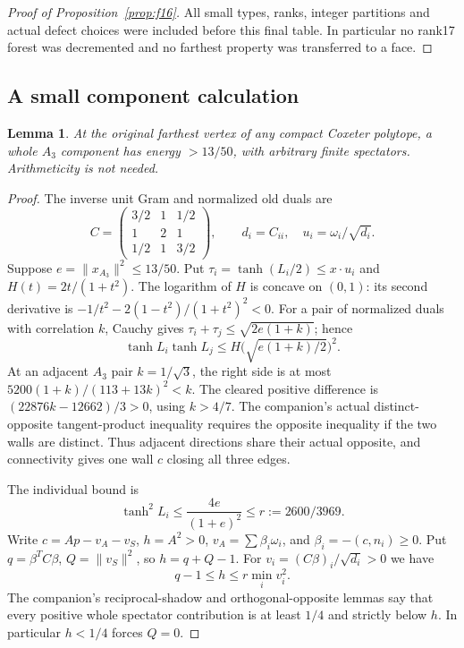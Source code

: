 \documentclass[11pt]{article}
\newtheorem{lemma}[theorem]{Lemma}
\begin{document}
\begin{proof}[Proof of Proposition~\ref{prop:f16}]
All small types, ranks, integer partitions and actual defect choices
were included before this final table. In particular no rank17 forest
was decremented and no farthest property was transferred to a face.
\end{proof}

\subsection{A small component calculation}

\begin{lemma}\label{lem:A3point26}
At the original farthest vertex of any compact Coxeter polytope,
a whole $A_3$ component has energy $>13/50$, with arbitrary finite
spectators. Arithmeticity is not needed.
\end{lemma}
\begin{proof}
The inverse unit Gram and normalized old duals are
\[
 C=\begin{pmatrix}3/2&1&1/2\\1&2&1\\1/2&1&3/2\end{pmatrix},
 \qquad d_i=C_{ii},\quad u_i=\omega_i/\sqrt{d_i}.
\]
Suppose $e=\|x_{A_3}\|^2\le13/50$. Put
$\tau_i=\tanh(L_i/2)\le x\cdot u_i$ and
$H(t)=2t/(1+t^2)$. The logarithm of $H$ is concave on $(0,1)$:
its second derivative is $-1/t^2-2(1-t^2)/(1+t^2)^2<0$.
For a pair of normalized duals with correlation $k$, Cauchy gives
$\tau_i+\tau_j\le\sqrt{2e(1+k)}$; hence
\[
 \tanh L_i\tanh L_j
 \le H\bigl(\sqrt{e(1+k)/2}\bigr)^2.
\]
At an adjacent $A_3$ pair $k=1/\sqrt3$, the right side is at most
$5200(1+k)/(113+13k)^2<k$.
The cleared positive difference is $(22876k-12662)/3>0$,
using $k>4/7$. The companion's actual distinct-opposite
tangent-product inequality requires the opposite inequality if the
two walls are distinct. Thus adjacent directions share their actual
opposite, and connectivity gives one wall $c$ closing all three edges.

The individual bound is
\[
 \tanh^2L_i\le\frac{4e}{(1+e)^2}\le r:=2600/3969.
\]
Write $c=A p-v_A-v_S$, $h=A^2>0$,
$v_A=\sum\beta_i\omega_i$, and $\beta_i=-(c,n_i)\ge0$.
Put $q=\beta^TC\beta$, $Q=\|v_S\|^2$, so $h=q+Q-1$.
For $v_i=(C\beta)_i/\sqrt{d_i}>0$ we have
\begin{equation}\label{eq:A3smallheight}
 q-1\le h\le r\min_i v_i^2.
\end{equation}
The companion's reciprocal-shadow and orthogonal-opposite lemmas
say that every positive whole spectator contribution is at least
$1/4$ and strictly below $h$. In particular $h<1/4$ forces $Q=0$.


\end{proof}
\end{document}
